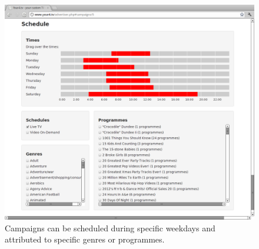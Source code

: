 \begin{figure}[th]
	\centering
	\includegraphics[width=\textwidth,height=0.5\textheight,keepaspectratio]{images/screenshots/advertiser-campaign-schedule.png}
	\caption{Campaigns can be scheduled during specific weekdays and attributed to specific genres or programmes.}
	\label{fig:advertiser-campaign-schedule}
\end{figure}
